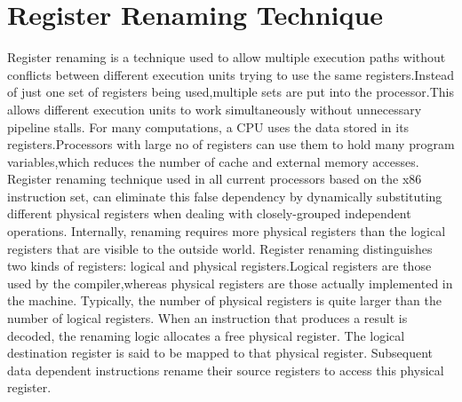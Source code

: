 \chapter{Register Renaming Technique}
Register renaming is a technique used to allow multiple execution paths without conflicts between different execution units trying to use the same registers.Instead of just one set of registers being used,multiple sets are put into the processor.This allows different execution units to work simultaneously without unnecessary pipeline stalls. For many computations, a CPU uses the data stored in its registers.Processors with large no of registers can use them to hold many program variables,which reduces the number of cache and external memory accesses. Register renaming technique used in all current processors based on the x86 instruction set, can eliminate this false dependency by dynamically substituting different physical registers when dealing with closely-grouped independent operations. Internally, renaming requires more physical registers than the logical registers that are visible to the outside world.
Register renaming distinguishes two kinds of registers: logical and physical registers.Logical registers are those used by the compiler,whereas physical registers are those actually implemented in the machine. Typically, the number of physical registers is quite larger than the number of logical registers. When an instruction that produces a result is decoded, the renaming logic allocates a free physical register. The logical destination register is said to be mapped to that physical register. Subsequent data dependent instructions rename their source registers to access this physical register.


